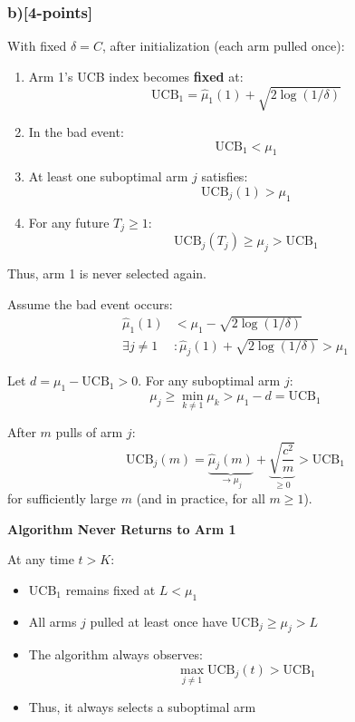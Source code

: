 \documentclass[12pt]{article}
\begin{document}
{{\subsubsection{b)[4-points]}

With fixed $\delta = C$, after initialization (each arm pulled once):
\begin{enumerate}
    \item Arm 1's UCB index becomes \textbf{fixed} at:
    \[
    \mathrm{UCB}_1 = \hat{\mu}_1(1) + \sqrt{2\log(1/\delta)}
    \]
    
    \item In the bad event:
    \[
    \mathrm{UCB}_1 < \mu_1
    \]
    
    \item At least one suboptimal arm $j$ satisfies:
    \[
    \mathrm{UCB}_j(1) > \mu_1
    \]
    
    \item For any future $T_j \geq 1$:
    \[
    \mathrm{UCB}_j(T_j) \geq \mu_j > \mathrm{UCB}_1
    \]
\end{enumerate}
Thus, arm 1 is never selected again.

Assume the bad event occurs:
\begin{align}
    \hat{\mu}_1(1) &< \mu_1 - \sqrt{2\log(1/\delta)} \label{eq:under} \\
    \exists j \neq 1 &: \hat{\mu}_j(1) + \sqrt{2\log(1/\delta)} > \mu_1 \label{eq:over}
\end{align}

Let $d = \mu_1 - \mathrm{UCB}_1 > 0$. For any suboptimal arm $j$:
\[
\mu_j \geq \min_{k \neq 1} \mu_k > \mu_1 - d = \mathrm{UCB}_1
\]

After $m$ pulls of arm $j$:
\[
\mathrm{UCB}_j(m) = \underbrace{\hat{\mu}_j(m)}_{\to \mu_j} + \underbrace{\sqrt{\frac{c^2}{m}}}_{\geq 0} > \mathrm{UCB}_1
\]
for sufficiently large $m$ (and in practice, for all $m \geq 1$).

\textbf{Algorithm Never Returns to Arm 1}

At any time $t > K$:
\begin{itemize}
    \item $\mathrm{UCB}_1$ remains fixed at $L < \mu_1$
    \item All arms $j$ pulled at least once have $\mathrm{UCB}_j \geq \mu_j > L$
    \item The algorithm always observes:
    \[
    \max_{j \neq 1} \mathrm{UCB}_j(t) > \mathrm{UCB}_1
    \]
    \item Thus, it always selects a suboptimal arm
\end{itemize}

}}
\end{document}
